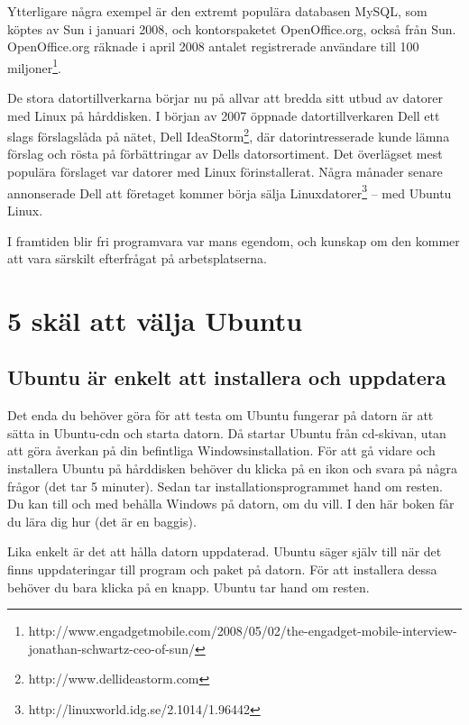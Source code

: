 \documentclass[a4paper,final]{memoir} %
\begin{document}
Ytterligare några exempel är den extremt populära databasen MySQL, som köptes av Sun i januari 2008, och kontorspaketet OpenOffice.org, också från Sun. OpenOffice.org räknade i april 2008 antalet registrerade användare till 100 miljoner\footnote{http://www.engadgetmobile.com/2008/05/02/the-engadget-mobile-interview-jonathan-schwartz-ceo-of-sun/}.

De stora datortillverkarna börjar nu på allvar att bredda sitt utbud av datorer med Linux på hårddisken. I början av 2007 öppnade datortillverkaren Dell ett slags förslagslåda på nätet, Dell IdeaStorm\footnote{http://www.dellideastorm.com}, där datorintresserade kunde lämna förslag och rösta på förbättringar av Dells datorsortiment. Det överlägset mest populära förslaget var datorer med Linux förinstallerat. Några månader senare annonserade Dell att företaget kommer börja sälja Linuxdatorer\footnote{http://linuxworld.idg.se/2.1014/1.96442} -- med Ubuntu Linux. %

I framtiden blir fri programvara var mans egendom, och kunskap om den kommer att vara särskilt efterfrågat på arbetsplatserna. 

\section{5 skäl att välja Ubuntu}


\subsection{Ubuntu är enkelt att installera och uppdatera}

Det enda du behöver göra för att testa om Ubuntu fungerar på datorn är att sätta in Ubuntu-cdn och starta datorn. Då startar Ubuntu från cd-skivan, utan att göra åverkan på din befintliga Windowsinstallation. För att gå vidare och installera Ubuntu på hårddisken behöver du klicka på en ikon och svara på några frågor (det tar 5 minuter). Sedan tar installationsprogrammet hand om resten. Du kan till och med behålla Windows på datorn, om du vill. I den här boken får du lära dig hur (det är en baggis).

Lika enkelt är det att hålla datorn uppdaterad. Ubuntu säger själv till när det finns uppdateringar till program och paket på datorn. För att installera dessa behöver du bara klicka på en knapp. Ubuntu tar hand om resten.
\end{document}
